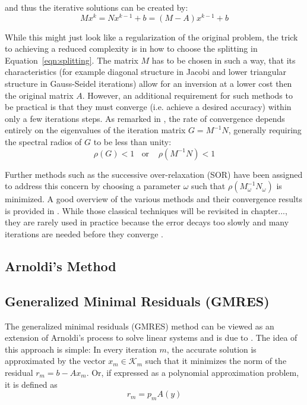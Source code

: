 \noindent and thus the iterative solutions can be created by:
\begin{equation}
    Mx^k = Nx^{k-1} +b = (M-A)x^{k-1}+b
\end{equation}

\noindent While this might just look like a regularization of the original problem, the trick to achieving a reduced complexity is in how to choose the splitting in Equation~\hyperref[eqn:splitting]{\ref{eqn:splitting}}. The matrix $M$ has to be chosen in such a way, that its characteristics (for example diagonal structure in Jacobi and lower triangular structure in Gauss-Seidel iterations) allow for an inversion at a lower cost then the original matrix $A$. However, an additional requirement for such methods to be practical is that they must converge (i.e. achieve a desired accuracy) within only a few iterations steps. As remarked in \cite{golub_matrix_2013}, the rate of convergence depends entirely on the eigenvalues of the iteration matrix $G=M^{-1}N$, generally requiring the spectral radios of $G$ to be less than unity:
\begin{equation}
    \rho(G) < 1 \;\;\text{ or }\;\;\ \rho(M^{-1}N)<1
\end{equation}

\noindent Further methods such as the successive over-relaxation (SOR) have been assigned to address this concern by choosing a parameter $\omega$ such that $\rho(M_\omega^{-1}N_\omega)$ is minimized. A good overview of the various methods and their convergence results is provided in \cite{saad_iterative_2003}. 
While those classical techniques will be revisited in chapter..., they are rarely used in practice because the error decays too slowly and many iterations are needed before they converge \cite{strang_introduction_2009}.




\subsection{Arnoldi's Method}
\label{sec:arnoldi}




\subsection{Generalized Minimal Residuals (GMRES)}
\label{sec:gmres}

The generalized minimal residuals (GMRES) method can be viewed as an extension of Arnoldi's process to solve linear systems and is due to \cite{saad_gmres_1986}. The idea of this approach is simple: In every iteration $m$, the accurate solution is approximated by the vector $x_m \in \mathcal{K}_m$ such that it minimizes the norm of the residual $r_m=b-Ax_m$. Or, if expressed as a polynomial approximation problem, it is defined as
\begin{equation}
    r_m=p_mA(y)
\end{equation}

